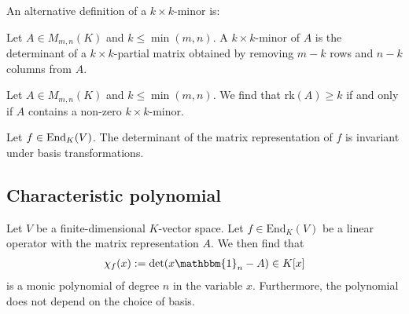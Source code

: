     An alternative definition of a $k\times k$-minor is:
    \begin{adefinition}[Minor]
        Let $A\in M_{m,n}(K)$ and $k\leq\min(m, n)$. A $k\times k$-minor of $A$ is the determinant of a $k\times k$-partial matrix obtained by removing $m-k$ rows and $n-k$ columns from $A$.
    \end{adefinition}
    \begin{property}
        Let $A\in M_{m,n}(K)$ and $k\leq\min(m, n)$. We find that $\text{rk}(A)\geq k$ if and only if $A$ contains a non-zero $k\times k$-minor.
    \end{property}

    \begin{property}
        Let $f\in\textup{End}_K(V)$. The determinant of the matrix representation of $f$ is invariant under basis transformations.
    \end{property}

\subsection{Characteristic polynomial}

    \begin{definition}\label{linalgebra:characteristic_polynomial}
        Let $V$ be a finite-dimensional $K$-vector space. Let $f\in \text{End}_K(V)$ be a linear operator with the matrix representation $A$. We then find that
        \begin{gather}
            \chi_f(x) := \det(x\mathbbm{1}_n - A) \in K[x]
        \end{gather}
        is a monic polynomial of degree $n$ in the variable $x$. Furthermore, the polynomial does not depend on the choice of basis.
    \end{definition}

